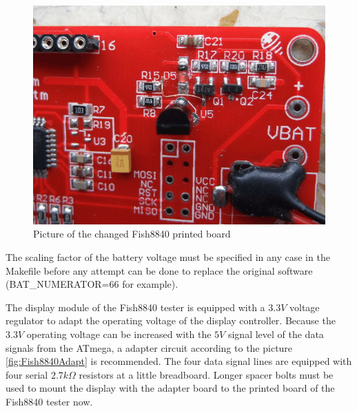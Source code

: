 \begin{figure}[H]
\centering
\includegraphics[width=12cm]{../PNG/Fish8840patch.jpg}
\caption{Picture of the changed Fish8840 printed board}
\label{fig:Fish8840patch}
\end{figure}

The scaling factor of the battery voltage must be specified in any case in the Makefile before any
attempt can be done to replace the original software (BAT\_NUMERATOR=66 for example).

The display module of the Fish8840 tester is equipped with a \(3.3V\) voltage regulator to adapt
the operating voltage of the display controller.
Because the \(3.3V\) operating voltage can be increased with the \(5V\) signal level of the data signals
from the ATmega, a adapter circuit according to the picture \ref{fig:Fish8840Adapt} is recommended.
The four data signal lines are equipped with four serial \(2.7k\Omega\) resistors at a little
breadboard.
Longer spacer bolts must be used to mount the display with the adapter board to the printed board
of the Fish8840 tester now.

